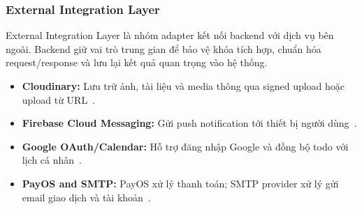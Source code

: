 \subsubsection{External Integration Layer}
\label{subsubsec:external-integration-context}

External Integration Layer là nhóm adapter kết nối backend với dịch vụ bên ngoài. Backend giữ vai trò trung gian để bảo vệ khóa tích hợp, chuẩn hóa request/response và lưu lại kết quả quan trọng vào hệ thống.

\begin{itemize}
    \item \textbf{Cloudinary:} Lưu trữ ảnh, tài liệu và media thông qua signed upload hoặc upload từ URL~\cite{cloudinaryjava}.
    \item \textbf{Firebase Cloud Messaging:} Gửi push notification tới thiết bị người dùng~\cite{firebasefcm}.
    \item \textbf{Google OAuth/Calendar:} Hỗ trợ đăng nhập Google và đồng bộ todo với lịch cá nhân~\cite{googlecalendarjava}.
    \item \textbf{PayOS and SMTP:} PayOS xử lý thanh toán; SMTP provider xử lý gửi email giao dịch và tài khoản~\cite{payoswebhook}.
\end{itemize}